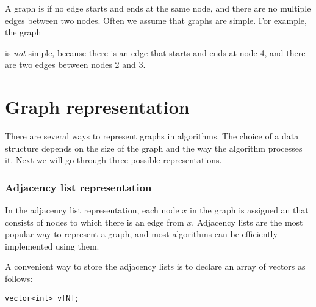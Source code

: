 
A graph is 
if no edge starts and ends at the same node,
and there are no multiple
edges between two nodes.
Often we assume that graphs are simple.
For example, the graph
\begin{center}
\end{center}
is \emph{not} simple, because there is an edge that starts
and ends at node 4, and there are two edges
between nodes 2 and 3.

\section{Graph representation}

There are several ways to represent graphs
in algorithms.
The choice of a data structure
depends on the size of the graph and
the way the algorithm processes it.
Next we will go through three possible representations.

\subsubsection{Adjacency list representation}


In the adjacency list representation,
each node $x$ in the graph is assigned an 
that consists of nodes
to which there is an edge from $x$.
Adjacency lists are the most popular
way to represent a graph, and most algorithms can be
efficiently implemented using them.

A convenient way to store the adjacency lists is to declare
an array of vectors as follows:
\begin{lstlisting}
vector<int> v[N];
\end{lstlisting}

